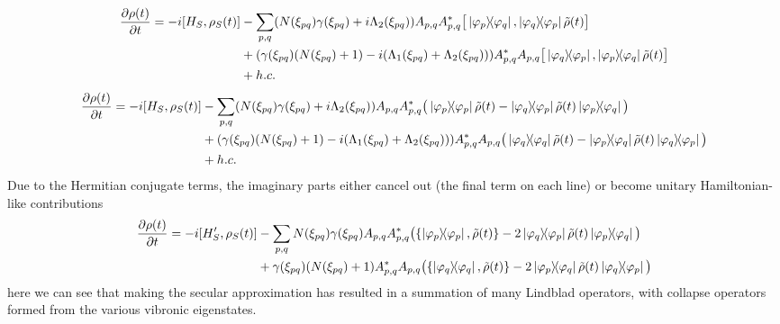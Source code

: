 \documentclass[]{article}
\begin{document}
\begin{align}
	\label{eq:VibronicSecular1}
	\begin{split}
		\pdv{\rho(t)}{t} = -i[H_S, \rho_S(t)] &- \sum_{p,q}  (N(\xi_{pq})\gamma(\xi_{pq})+i\Lambda_2(\xi_{pq})) A_{p,q}A_{p,q}^{*}\big[\dyad{\varphi_p}{\varphi_q}, \dyad{\varphi_q}{\varphi_p}\tilde{\rho}(t)\big] \\
		&+ (\gamma(\xi_{pq})(N(\xi_{pq})+1)-i(\Lambda_1(\xi_{pq})+\Lambda_2(\xi_{pq})))  A_{p,q}^{*}A_{p,q}\big[\dyad{\varphi_q}{\varphi_p}, \dyad{\varphi_p}{\varphi_q}\tilde{\rho}(t)\big]\\ &+ h.c. \\
	\end{split}
\end{align}
\begin{align}
	\label{eq:VibronicSecular2}
	\begin{split}
		\pdv{\rho(t)}{t} = -i[H_S, \rho_S(t)] &- \sum_{p,q}  (N(\xi_{pq})\gamma(\xi_{pq})+i\Lambda_2(\xi_{pq})) A_{p,q}A_{p,q}^{*}\big(\dyad{\varphi_p}{\varphi_p}\tilde{\rho}(t) - \dyad{\varphi_q}{\varphi_p}\tilde{\rho}(t)\dyad{\varphi_p}{\varphi_q}\big) \\
		&+ (\gamma(\xi_{pq})(N(\xi_{pq})+1)-i(\Lambda_1(\xi_{pq})+\Lambda_2(\xi_{pq})))  A_{p,q}^{*}A_{p,q}\big(\dyad{\varphi_q}{\varphi_q}\tilde{\rho}(t) - \dyad{\varphi_p}{\varphi_q}\tilde{\rho}(t)\dyad{\varphi_q}{\varphi_p}\big)\\ &+ h.c. \\
	\end{split}
\end{align}
Due to the Hermitian conjugate terms, the imaginary parts either cancel out (the final term on each line) or become unitary Hamiltonian-like contributions
\begin{align}
	\label{eq:VibronicSecular2}
	\begin{split}
		\pdv{\rho(t)}{t} = -i[H_S^{\prime}, \rho_S(t)] &- \sum_{p,q}  N(\xi_{pq})\gamma(\xi_{pq}) A_{p,q}A_{p,q}^{*}\big(\{\dyad{\varphi_p}{\varphi_p}, \tilde{\rho}(t)\} - 2\dyad{\varphi_q}{\varphi_p}\tilde{\rho}(t)\dyad{\varphi_p}{\varphi_q}\big) \\
		&+ \gamma(\xi_{pq})(N(\xi_{pq})+1)  A_{p,q}^{*}A_{p,q}\big(\{\dyad{\varphi_q}{\varphi_q}, \tilde{\rho}(t)\} - 2\dyad{\varphi_p}{\varphi_q}\tilde{\rho}(t)\dyad{\varphi_q}{\varphi_p}\big) \\
	\end{split}
\end{align}
here we can see that making the secular approximation has resulted in a summation of many Lindblad operators, with collapse operators formed from the various vibronic eigenstates.
\end{document}
